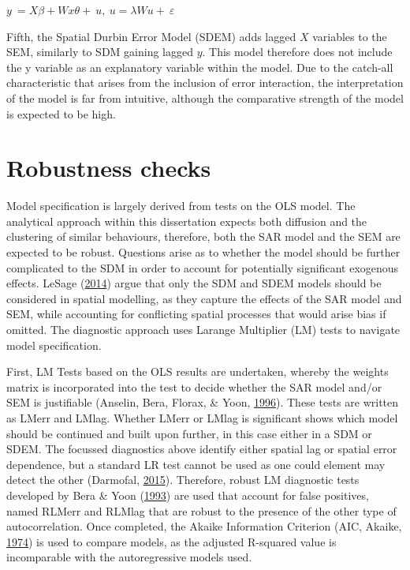 \documentclass[12pt,twoside]{reedthesis}
\begin{document}
\(y\ =X\beta+Wx\theta+\ u,\ u=\lambda Wu+\ \varepsilon\)\\
\hspace*{0.333em}

Fifth, the Spatial Durbin Error Model (SDEM) adds lagged \(X\) variables to the SEM, similarly to SDM gaining lagged \(y\). This model therefore does not include the y variable as an explanatory variable within the model. Due to the catch-all characteristic that arises from the inclusion of error interaction, the interpretation of the model is far from intuitive, although the comparative strength of the model is expected to be high.

\hypertarget{robustness-checks}{%
\section{Robustness checks}\label{robustness-checks}}

Model specification is largely derived from tests on the OLS model. The analytical approach within this dissertation expects both diffusion and the clustering of similar behaviours, therefore, both the SAR model and the SEM are expected to be robust. Questions arise as to whether the model should be further complicated to the SDM in order to account for potentially significant exogenous effects. LeSage (\protect\hyperlink{ref-lesage2014a}{2014}) argue that only the SDM and SDEM models should be considered in spatial modelling, as they capture the effects of the SAR model and SEM, while accounting for conflicting spatial processes that would arise bias if omitted. The diagnostic approach uses Larange Multiplier (LM) tests to navigate model specification.

First, LM Tests based on the OLS results are undertaken, whereby the weights matrix is incorporated into the test to decide whether the SAR model and/or SEM is justifiable (Anselin, Bera, Florax, \& Yoon, \protect\hyperlink{ref-anselin1996}{1996}). These tests are written as LMerr and LMlag. Whether LMerr or LMlag is significant shows which model should be continued and built upon further, in this case either in a SDM or SDEM. The focussed diagnostics above identify either spatial lag or spatial error dependence, but a standard LR test cannot be used as one could element may detect the other (Darmofal, \protect\hyperlink{ref-darmofal2015}{2015}). Therefore, robust LM diagnostic tests developed by Bera \& Yoon (\protect\hyperlink{ref-bera1993}{1993}) are used that account for false positives, named RLMerr and RLMlag that are robust to the presence of the other type of autocorrelation. Once completed, the Akaike Information Criterion (AIC, Akaike, \protect\hyperlink{ref-akaike1974}{1974}) is used to compare models, as the adjusted R-squared value is incomparable with the autoregressive models used.
\end{document}
